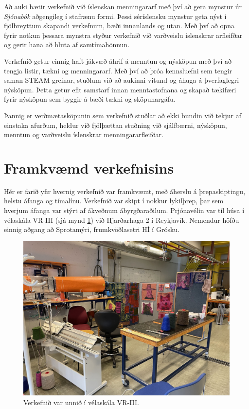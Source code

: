 \documentclass[a4paper,12pt,twoside]{article}
\begin{document}
Að auki bætir verkefnið við íslenskan menningararf með því að gera mynstur úr \textit{Sjónabók} aðgengileg í stafrænu formi. Þessi sér\-íslensku mynstur geta nýst í fjölbreyttum skapandi verkefnum, bæði innanlands og utan. Með því að opna fyrir notkun þessara mynstra styður verkefnið við varðveislu íslenskrar arfleifðar og gerir hana að hluta af samtímahönnun.

Verkefnið getur einnig haft jákvæð áhrif á menntun og nýsköpun með því að tengja listir, tækni og menningararf. Með því að þróa kennsluefni sem tengir saman STEAM greinar, stuðlum við að aukinni vitund og áhuga á þverfaglegri nýsköpun. Þetta getur eflt samstarf innan menntastofnana og skapað tækifæri fyrir nýsköpun sem byggir á bæði tækni og sköpunargáfu.

Þannig er verðmætasköpunin sem verkefnið stuðlar að ekki bundin við tekjur af einstaka afurðum, heldur við fjölþættan stuðning við sjálfbærni, nýsköpun, menntun og varðveislu íslenskrar menningararfleifðar.

\section{Framkvæmd verkefnisins}
Hér er farið yfir hvernig verkefnið var framkvæmt, með áherslu á þrepaskiptingu, helstu áfanga og tímalínu. Verkefnið var skipt í nokkur lykilþrep, þar sem hverjum áfanga var stýrt af ákveðnum ábyrgðaraðilum. Prjónavélin var til húsa í vélaskála VR-III (sjá mynd \ref{fig:workshop}) við Hjarðarhaga 2 í Reykjavík. Nemendur höfðu einnig aðgang að Sprotamýri, frumkvöðlasetri HÍ í Grósku.

\begin{figure}
    \centering
    \includegraphics[width=0.9\linewidth]{myndir/workshop.jpg}
    \caption{Verkefnið var unnið í vélaskála VR-III.}
    \label{fig:workshop}
\end{figure}
\end{document}
